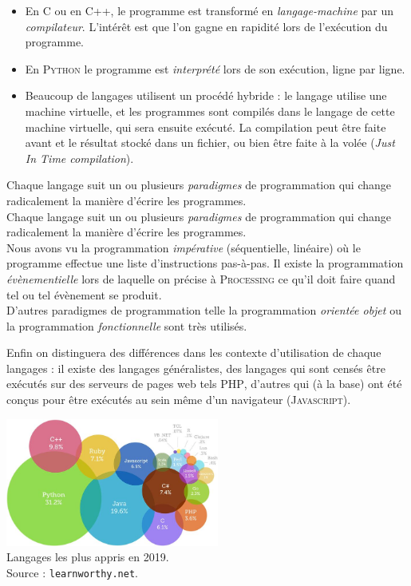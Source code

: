 \begin{itemize}
    \item   En \textsc{C} ou en \textsc{C++}, le programme est transformé en \textit{langage-machine} par un \textit{compilateur}. L'intérêt est que l'on gagne en rapidité lors de l'exécution du programme.
    \item   En \textsc{Python} le programme est \textit{interprété}  lors de son exécution, ligne par ligne.
    \item   Beaucoup de langages utilisent un procédé hybride : le langage utilise une machine virtuelle, et les programmes sont compilés dans le langage de cette machine virtuelle, qui sera ensuite exécuté. La compilation peut être faite avant et le résultat stocké dans un fichier, ou bien être faite à la volée (\textit{Just In Time compilation}).
\end{itemize}



Chaque langage suit un ou plusieurs \textit{paradigmes} de programmation qui change radicalement la manière d'écrire les programmes.\\
Chaque langage suit un ou plusieurs \textit{paradigmes} de programmation qui change radicalement la manière d'écrire les programmes.\\
Nous avons vu la programmation \textit{impérative} (séquentielle, linéaire) où le programme effectue une liste d'instructions pas-à-pas. Il existe la programmation \textit{évènementielle} lors de laquelle on précise à \textsc{Processing} ce qu'il doit faire quand tel ou tel évènement se produit.\\
D'autres paradigmes de programmation telle la programmation \textit{orientée objet} ou la programmation \textit{fonctionnelle} sont très utilisés.

Enfin on distinguera des différences dans les contexte d'utilisation de chaque langages : il existe des langages généralistes, des langages qui sont censés être exécutés sur des \og serveurs de pages web\fg{} tels \textsc{PHP}, d'autres qui (à la base) ont été conçus pour être exécutés au sein même d'un navigateur (\textsc{Javascript}).

\begin{center}
    \includegraphics[width=7cm]{ch-langages/img/languages.png}\\ \scriptsize   Langages les plus appris en 2019.\\
    Source : \texttt{learnworthy.net}.
\end{center}
